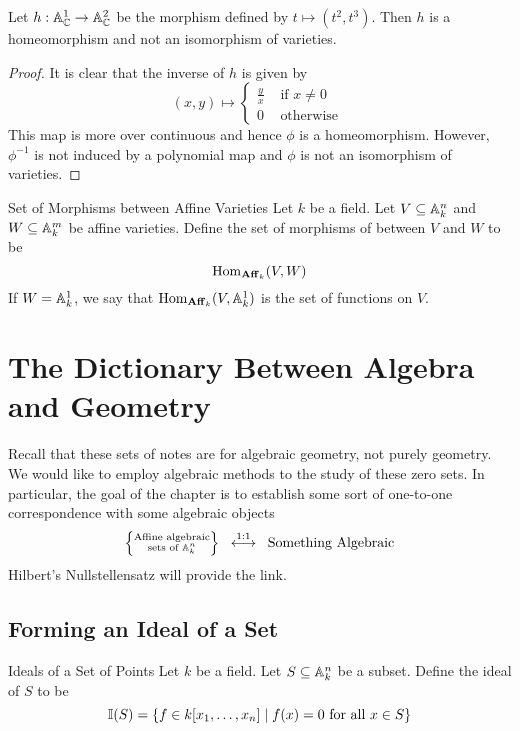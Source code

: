 \documentclass[a4paper]{article}
\begin{document}
\begin{eg}{}{} Let $h:\mathbb{A}_{\mathbb{C}}^1\to\mathbb{A}_{\mathbb{C}}^2$ be the morphism defined by $t\mapsto(t^2,t^3)$. Then $h$ is a homeomorphism and not an isomorphism of varieties. \tcbline
\begin{proof}
It is clear that the inverse of $h$ is given by $$(x,y)\mapsto\begin{cases}
\frac{y}{x} & \text{ if }x\neq 0\\
0 & \text{ otherwise }
\end{cases}$$ This map is more over continuous and hence $\phi$ is a homeomorphism. However, $\phi^{-1}$ is not induced by a polynomial map and $\phi$ is not an isomorphism of varieties. 
\end{proof}
\end{eg}

\begin{defn}{Set of Morphisms between Affine Varieties}{} Let $k$ be a field. Let $V\subseteq\mathbb{A}_k^n$ and $W\subseteq\mathbb{A}_k^m$ be affine varieties. Define the set of morphisms of between $V$ and $W$ to be $$\operatorname{Hom}_{\bold{Aff}_k}(V,W)$$ If $W=\mathbb{A}_k^1$, we say that $\operatorname{Hom}_{\bold{Aff}_k}(V,\mathbb{A}_k^1)$ is the set of functions on $V$. 
\end{defn}

\pagebreak
\section{The Dictionary Between Algebra and Geometry}
Recall that these sets of notes are for algebraic geometry, not purely geometry. We would like to employ algebraic methods to the study of these zero sets. In particular, the goal of the chapter is to establish some sort of one-to-one correspondence with some algebraic objects $$\left\{\substack{\text{Affine algebraic}\\\text{sets of }\mathbb{A}_k^n}\right\}\;\;\overset{1:1}{\longleftrightarrow}\;\;\text{Something Algebraic}$$ Hilbert's Nullstellensatz will provide the link. 

\subsection{Forming an Ideal of a Set}
\begin{defn}{Ideals of a Set of Points}{} Let $k$ be a field. Let $S\subseteq\mathbb{A}_k^n$ be a subset. Define the ideal of $S$ to be $$\mathbb{I}(S)=\{f\in k[x_1,\dots,x_n]\;|\;f(x)=0\text{ for all }x\in S\}$$ 
\end{defn}
\end{document}
